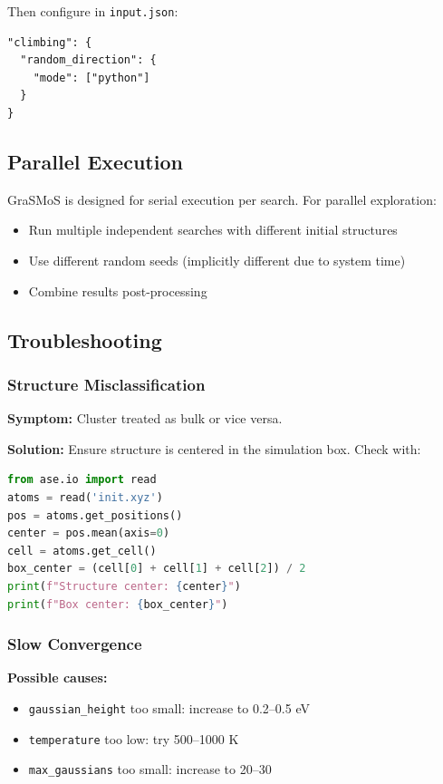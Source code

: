 \documentclass[11pt,a4paper]{article}
\begin{document}
Then configure in \texttt{input.json}:

\begin{lstlisting}[style=jsonStyle]
"climbing": {
  "random_direction": {
    "mode": ["python"]
  }
}
\end{lstlisting}

\subsection{Parallel Execution}
GraSMoS is designed for serial execution per search. For parallel exploration:
\begin{itemize}
    \item Run multiple independent searches with different initial structures
    \item Use different random seeds (implicitly different due to system time)
    \item Combine results post-processing
\end{itemize}

\subsection{Troubleshooting}

\subsubsection{Structure Misclassification}
\textbf{Symptom:} Cluster treated as bulk or vice versa.

\textbf{Solution:} Ensure structure is centered in the simulation box. Check with:
\begin{lstlisting}[language=Python, style=jsonStyle]
from ase.io import read
atoms = read('init.xyz')
pos = atoms.get_positions()
center = pos.mean(axis=0)
cell = atoms.get_cell()
box_center = (cell[0] + cell[1] + cell[2]) / 2
print(f"Structure center: {center}")
print(f"Box center: {box_center}")
\end{lstlisting}

\subsubsection{Slow Convergence}
\textbf{Possible causes:}
\begin{itemize}
    \item \texttt{gaussian\_height} too small: increase to 0.2--0.5 eV
    \item \texttt{temperature} too low: try 500--1000 K
    \item \texttt{max\_gaussians} too small: increase to 20--30
\end{itemize}
\end{document}
